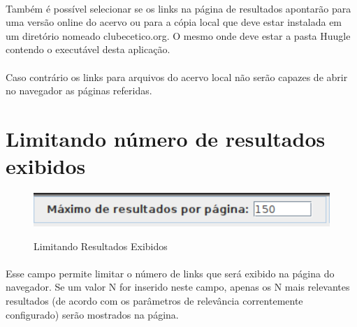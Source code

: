 \documentclass[a4paper,12pt,openany]{book}
\begin{document}
\paragraph{}
Também é possível selecionar se os links na página de resultados apontarão para uma versão online do acervo ou para a cópia local que deve estar instalada em um diretório nomeado clubecetico.org. O mesmo onde deve estar a pasta Huugle contendo o executável desta aplicação.
\paragraph{}
Caso contrário os links para arquivos do acervo local não serão capazes de abrir no navegador as páginas referidas.

\section*{Limitando número de resultados exibidos}

\begin{figure}[h]
	\caption{Limitando Resultados Exibidos}
	
	\centering %
	\includegraphics[width=15cm]{Figuras/resultados-por-pagina.png} %
	\label{figura:qualquernome}
\end{figure}

\paragraph{}
Esse campo permite limitar o número de links que será exibido na página do navegador. Se um valor N for inserido neste campo, apenas os N mais relevantes resultados (de acordo com os parâmetros de relevância correntemente configurado) serão mostrados na página.

\newpage

\appendix
\end{document}
